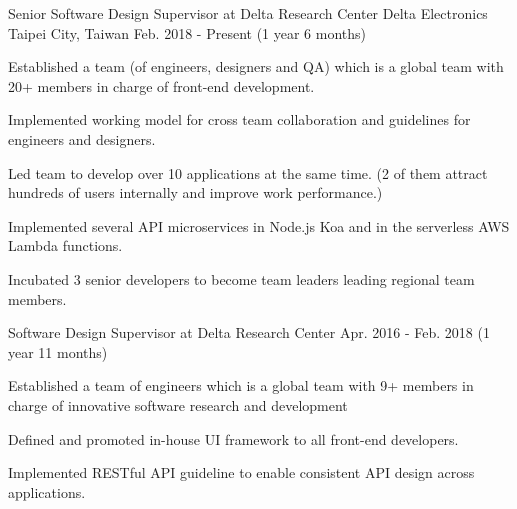 

\begin{cventries}

  \cventry
    {Senior Software Design Supervisor at Delta Research Center} %
    {Delta Electronics} %
    {Taipei City, Taiwan} %
    {Feb. 2018 - Present (1 year 6 months)} %
    {
      \begin{cvitems} %
        \item {Established a team (of engineers, designers and QA) which is a global team with 20+ members in charge of front-end development. }
        \item {Implemented working model for cross team collaboration and guidelines for engineers and designers.}
        \item {Led team to develop over 10 applications at the same time. (2 of them attract hundreds of users internally and improve work performance.)}
        \item {Implemented several API microservices in Node.js Koa and in the serverless AWS Lambda functions.}
        \item {Incubated 3 senior developers to become team leaders leading regional team members.}
      \end{cvitems}
    }

  \cventry
    {Software Design Supervisor at Delta Research Center} %
    {} %
    {} %
    {Apr. 2016 - Feb. 2018 (1 year 11 months)} %
    {
      \begin{cvitems} %
        \item {Established a team of engineers which is a global team with 9+ members in charge of innovative software research and development}
        \item {Defined and promoted in-house UI framework to all front-end developers.}
        \item {Implemented RESTful API guideline to enable consistent API design across applications.}
      \end{cvitems}
    }


\end{cventries}
